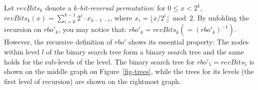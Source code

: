 \documentclass{llncs}
\begin{document}
Let $revBits_k$ denote a {\em $k$-bit-reversal permutation}:
  for $0 \le x < 2^k$,  
  $revBits_k (x) = \sum_{i = 0}^{k -1} 2^i \cdot x_{k - 1 - i}$, where $x_i = \lfloor x / 2^i\rfloor \bmod 2$.
By unfolding the recursion on $rbo'_k$,
you may notice that:
  $rbo'_k = revBits_k (= (rbo'_k)^{- 1})$. 
However, the recursive definition of $rbo'$ shows its essential property:
The nodes within level $l$ of the binary search tree form a binary search tree and
the same holds for the sub-levels of the level.
The binary search tree for $rbo'_5=revBits_5$ is shown on the middle graph on Figure~\ref{fig-trees},
while the trees for its levels (the first level of recursion) are shown on the rightmost graph.


\begin{figure}
\end{figure}
\end{document}
